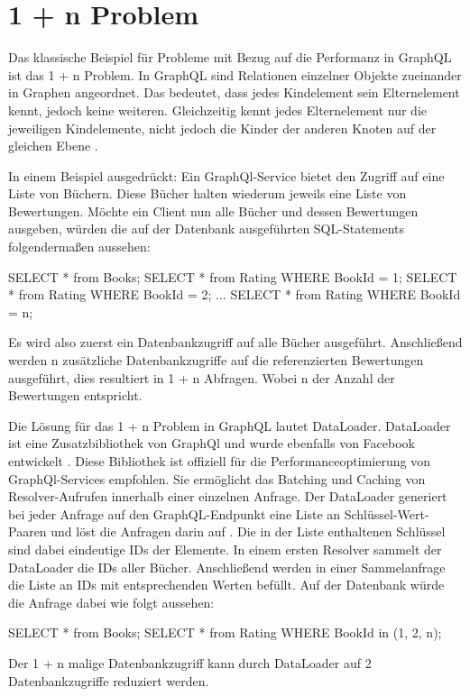 \section{1 + n Problem}
Das klassische Beispiel für Probleme mit Bezug auf die Performanz in GraphQL ist das 1 + n Problem.
In GraphQL sind Relationen einzelner Objekte zueinander in Graphen angeordnet.
Das bedeutet, dass jedes Kindelement sein Elternelement kennt, jedoch keine weiteren.
Gleichzeitig kennt jedes Elternelement nur die jeweiligen Kindelemente, nicht jedoch die Kinder der anderen Knoten auf der gleichen Ebene \cite[S. 104-105]{kress2020graphql}.
\newline

In einem Beispiel ausgedrückt: Ein GraphQl-Service bietet den Zugriff auf eine Liste von Büchern.
Diese Bücher halten wiederum jeweils eine Liste von Bewertungen.
Möchte ein Client nun alle Bücher und dessen Bewertungen ausgeben, würden die auf der Datenbank ausgeführten SQL-Statements folgendermaßen aussehen:
\begin{JsCode}
SELECT * from Books;
SELECT * from Rating WHERE BookId = 1;
SELECT * from Rating WHERE BookId = 2;
...
SELECT * from Rating WHERE BookId = n;
\end{JsCode}

Es wird also zuerst ein Datenbankzugriff auf alle Bücher ausgeführt.
Anschließend werden n zusätzliche Datenbankzugriffe auf die referenzierten Bewertungen ausgeführt, dies resultiert in 1 + n Abfragen.
Wobei n der Anzahl der Bewertungen entspricht.

Die Lösung für das 1 + n Problem in GraphQL lautet DataLoader.
DataLoader ist eine Zusatzbibliothek von GraphQl und wurde ebenfalls von Facebook entwickelt \cite[S. 105]{kress2020graphql}.
Diese Bibliothek ist offiziell für die Performanceoptimierung von GraphQl-Services empfohlen.
Sie ermöglicht das Batching und Caching von Resolver-Aufrufen innerhalb einer einzelnen Anfrage.
Der DataLoader generiert bei jeder Anfrage auf den GraphQL-Endpunkt eine Liste an Schlüssel-Wert-Paaren und löst die Anfragen darin auf \cite[S. 105]{kress2020graphql}.
Die in der Liste enthaltenen Schlüssel sind dabei eindeutige IDs der Elemente.
In einem ersten Resolver sammelt der DataLoader die IDs aller Bücher.
Anschließend werden in einer Sammelanfrage die Liste an IDs mit entsprechenden Werten befüllt.
Auf der Datenbank würde die Anfrage dabei wie folgt aussehen:

\begin{JsCode}
SELECT * from Books;
SELECT * from Rating WHERE BookId in (1, 2, n);
\end{JsCode}

Der 1 + n malige Datenbankzugriff kann durch DataLoader auf 2 Datenbankzugriffe reduziert werden.
